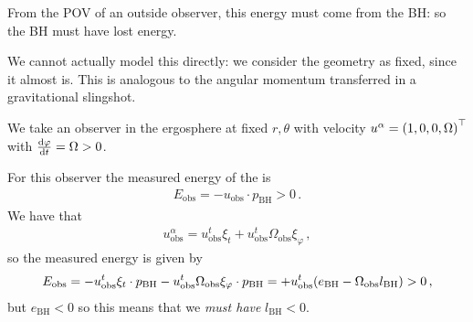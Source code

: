 \documentclass[main.tex]{subfiles}
\begin{document}
From the POV of an outside observer, this energy must come from the BH: so the BH must have lost energy. 

We cannot actually model this directly: we consider the geometry as fixed, since it almost is. 
This is analogous to the angular momentum transferred in a gravitational slingshot. 

We take an observer in the ergosphere at fixed \(r, \theta \) with velocity \(u^{\alpha } = \qty(1, 0, 0, \Omega )^{\top}\) with \(\dv{\varphi }{t }= \Omega >0\). 


For this observer the measured energy of the is 
%
\begin{align}
  E _{\text{obs}} = - u _{\text{obs}} \cdot p _{\text{BH}}>0
\,.
\end{align}
%
We have that 
%
\begin{align}
  u^{\alpha } _{\text{obs}} = u^{t} _{\text{obs}} \xi_{t} + u^{t} _{\text{obs}} \Omega _{\text{obs}} \xi_{\varphi }
\,,
\end{align}
%
so the measured energy is given by 
%
\begin{align}
E _{\text{obs}} = - u^{t} _{\text{obs}} \xi_{t} \cdot p _{\text{BH}} - u^{t} _{\text{obs}} \Omega _{\text{obs}} \xi_{\varphi } \cdot p _{\text{BH}} 
= + u^{t} _{\text{obs}} \qty( e _{\text{BH}}  - \Omega _{\text{obs}} l _{\text{BH}} )
> 0 
\,,
\end{align}
%
but \(e _{\text{BH}} <0\) so this means that we \emph{must have} \(l _{\text{BH}}<0\). 
\end{document}
